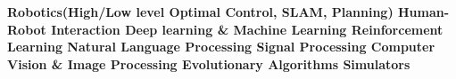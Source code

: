 \begin{cventries}
\begin{flushleft}
\textbf{{\fontsize{10pt}{1em}\bodyfontlight\upshape\color{text}  
    \bullet \space \textbf{Robotics(High/Low level Optimal Control, SLAM, Planning)}\newline
    \bullet \space \textbf{Human-Robot Interaction}\newline
    \bullet \space \textbf{Deep learning \& Machine Learning}\newline
    \bullet \space \textbf{Reinforcement Learning}\newline
    \bullet \space \textbf{Natural Language Processing}\newline
    \bullet \space \textbf{Signal Processing}\newline
    \bullet \space \textbf{Computer Vision \& Image Processing}\newline
    \bullet \space \textbf{Evolutionary Algorithms}\newline
    \bullet \space \textbf{Simulators}}}
\end{flushleft}
\end{cventries}
